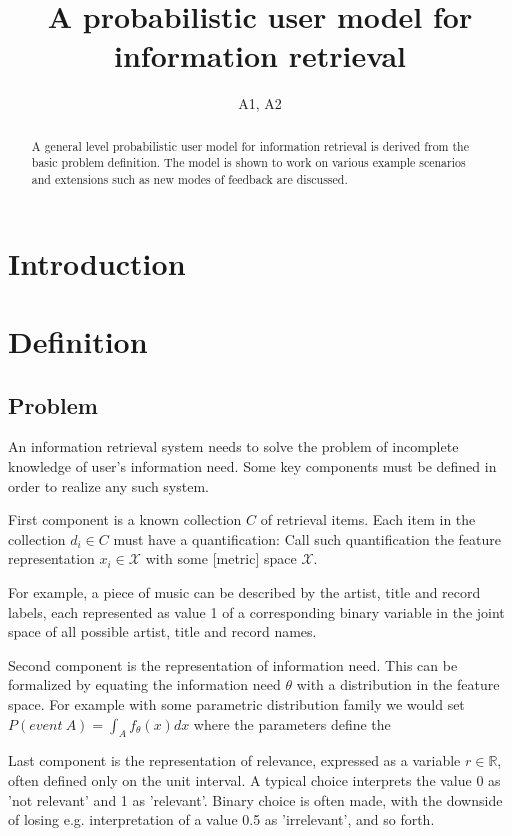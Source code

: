 \documentclass[10pt]{article}
\title{A probabilistic user model for information retrieval}
\author{A1, A2}
\date{}
\begin{document}
\maketitle
\begin{abstract}
 A general level probabilistic user model for information retrieval is derived from the basic problem definition. The model is shown to work on various example scenarios and extensions such as new modes of feedback are discussed.
\end{abstract}

\section{Introduction}

\section{Definition}
\subsection{Problem}
An information retrieval system needs to solve the problem of incomplete knowledge of user's information need. Some key components must be defined in order to realize any such system.

First component is a known collection $C$ of retrieval items. Each item in the collection $d_i \in C$ must have a quantification: Call such quantification the feature representation $x_i\in \mathcal X$ with some [metric] space $\mathcal X$. 

For example, a piece of music can be described by the artist, title and record labels, each represented as value 1 of a corresponding binary variable in the joint space of all possible artist, title and record names. 

Second component is the representation of information need. This can be formalized by equating the information need $\theta$ with a distribution in the feature space. For example with some parametric distribution family we would set $P(event\ A) = \int_A f_\theta (x) dx$ where the parameters define the 

Last component is the representation of relevance, expressed as a variable $r\in \mathbb R$, often defined only on the unit interval. A typical choice interprets the value 0 as 'not relevant' and 1 as 'relevant'. Binary choice is often made, with the downside of losing e.g. interpretation of a value 0.5 as 'irrelevant', and so forth.
\end{document}
